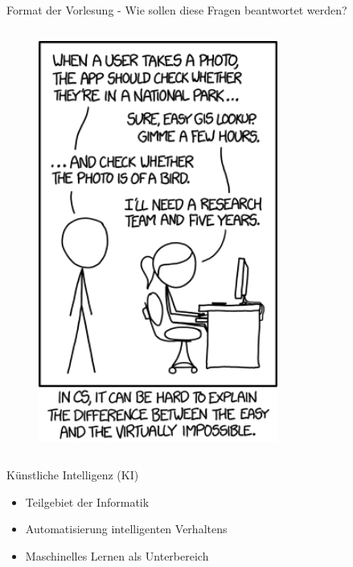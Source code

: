 \documentclass[aspectratio=1610, xcolor=dvipsnames, 9pt]{beamer}
\begin{document}
\begin{frame}{Format der Vorlesung - Wie sollen diese Fragen beantwortet werden?}
\begin{columns}
\begin{column}{0.3\textwidth}
\begin{figure}
             \includegraphics[width=0.7\textwidth]{images/tasks.png} 
 \end{figure}
    \end{column}
  \end{columns}
\end{frame}

\begin{frame}{Künstliche Intelligenz (KI)}
    \begin{itemize}
        \item Teilgebiet der Informatik \newline
        \item Automatisierung intelligenten Verhaltens \newline
        \item Maschinelles Lernen als Unterbereich \newline
    \end{itemize}
\end{frame}
\end{document}
